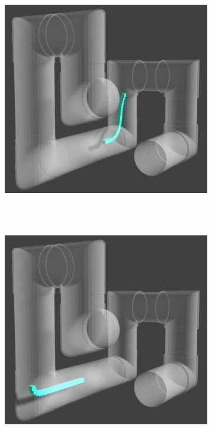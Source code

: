 \documentclass[12pt,a4]{article}
\begin{document}
\begin{figure}[ht!]
\begin{subfigure}{0.31\textwidth}
    \end{subfigure}%
    ~
        \begin{subfigure}{0.31\textwidth}
        \centering
        \includegraphics[width=0.8\linewidth]{figures/Pipesnaps/3.png}
      
    \end{subfigure}%
    \\~\\
    
       \begin{subfigure}{0.31\textwidth}
        \centering
        \includegraphics[width=0.8\linewidth]{figures/Pipesnaps/4.png}
       

\end{subfigure}
\end{figure}
\end{document}
